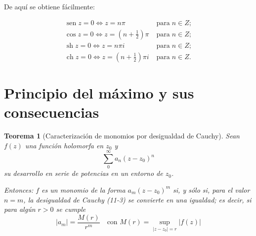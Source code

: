 \documentclass[10pt]{article}
\theoremstyle{plain}
\newtheorem{theorem}{Teorema}[section]
\theoremstyle{definition}
\theoremstyle{remark}
\begin{document}
De aquí se obtiene fácilmente:

$$
\begin{array}{ll}
\operatorname{sen} z=0 \Leftrightarrow z=n \pi & \operatorname{para} n \in Z ; \\
\cos z=0 \Longleftrightarrow z=\left(n+\frac{1}{2}\right) \pi & \operatorname{para} n \in Z ; \\
\operatorname{sh} z=0 \Longleftrightarrow z=n \pi i & \operatorname{para} n \in Z ; \\
\operatorname{ch} z=0 \Longleftrightarrow z=\left(n+\frac{1}{2}\right) \pi i & \operatorname{para} n \in Z .
\end{array}
$$

\section{Principio del máximo y sus consecuencias}

\begin{theorem}[Caracterización de monomios por desigualdad de Cauchy]
Sean $f(z)$ una función holomorfa en $z_{0}$ y
$$\sum_{0}^{\infty} a_{n}(z-z_{0})^{n}$$
su desarrollo en serie de potencias en un entorno de $z_{0}$.

Entonces: $f$ es un monomio de la forma $a_{m}(z-z_{0})^{m}$ si, y sólo si, para el valor $n=m$, la desigualdad de Cauchy (11-3) se convierte en una igualdad; es decir, si para algún $r>0$ se cumple
\begin{equation*}
\left|a_{m}\right|=\frac{M(r)}{r^{m}} \quad \text{con } M(r)=\sup_{\left|z-z_{0}\right|=r}|f(z)| \tag{13.1}
\end{equation*}
\end{theorem}
\end{document}
